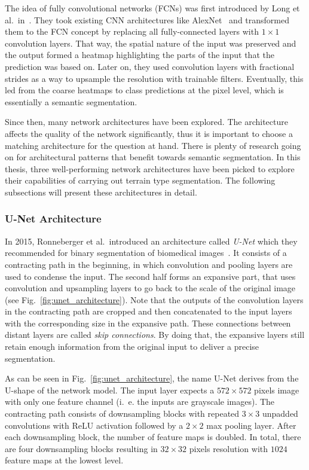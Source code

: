 The idea of fully convolutional networks (FCNs) was first introduced by Long et al.\ in~\cite{fcn15}. They took existing CNN architectures like AlexNet~\cite{alexnet12} and transformed them to the FCN concept by replacing all fully-connected layers with $1\times 1$ convolution layers. That way, the spatial nature of the input was preserved and the output formed a heatmap highlighting the parts of the input that the prediction was based on. Later on, they used convolution layers with fractional strides as a way to upsample the resolution with trainable filters. Eventually, this led from the coarse heatmaps to class predictions at the pixel level, which is essentially a semantic segmentation.

Since then, many network architectures have been explored. The architecture affects the quality of the network significantly, thus it is important to choose a matching architecture for the question at hand. There is plenty of research going on for architectural patterns that benefit towards semantic segmentation. In this thesis, three well-performing network architectures have been picked to explore their capabilities of carrying out terrain type segmentation. The following subsections will present these architectures in detail.

\subsubsection{U-Net Architecture}
\label{sec:unet}
In 2015, Ronneberger et al.\ introduced an architecture called \emph{U-Net} which they recommended for binary segmentation of biomedical images~\cite{unet15}. It consists of a contracting path in the beginning, in which convolution and pooling layers are used to condense the input. The second half forms an expansive part, that uses convolution and upsampling layers to go back to the scale of the original image (see Fig.~\ref{fig:unet_architecture}). Note that the outputs of the convolution layers in the contracting path are cropped and then concatenated to the input layers with the corresponding size in the expansive path. These connections between distant layers are called \emph{skip connections}. By doing that, the expansive layers still retain enough information from the original input to deliver a precise segmentation.

As can be seen in Fig.~\ref{fig:unet_architecture}, the name U-Net derives from the U-shape of the network model. The input layer expects a $572\times 572$ pixels image with only one feature channel (i.~e. the inputs are grayscale images). The contracting path consists of downsampling blocks with repeated $3\times 3$ unpadded convolutions with ReLU activation followed by a $2\times 2$ max pooling layer. After each downsampling block, the number of feature maps is doubled. In total, there are four downsampling blocks resulting in $32\times 32$ pixels resolution with $1024$ feature maps at the lowest level.

